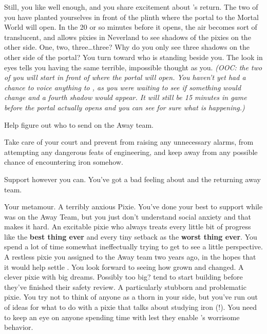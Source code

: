 \documentclass[char]{PP}
\begin{document}
Still, you like \cFButterfly{} well enough, and you share \cFButterfly{\their} excitement about \cFLost{}’s return. The two of you have planted yourselves in front of the plinth where the portal to the Mortal World will open. In the 20 or so minutes before it opens, the air becomes sort of translucent, and allows pixies in Neverland to see shadows of the pixies on the other side. One, two, three\ldots three? Why do you only see three shadows on the other side of the portal?  You turn toward \cFButterfly{} who is standing beside you. The look in \cFButterfly{\their} eyes tells you \cFButterfly{\they} \cFButterfly{\are} having the same terrible, impossible thought as you. \textit{(OOC: the two of you will start in front of where the portal will open. You haven’t yet had a chance to voice anything to \cFButterfly{}, as you were waiting to see if something would change and a fourth shadow would appear. It will still be 15 minutes in game before the portal actually opens and you can see for sure what is happening.)}

\begin{itemz}
	\item Help \cSHead{} figure out who to send on the Away team.
	\item Take care of your court and prevent \cMTree{} from raising any unnecessary alarms, \cMAirship{} from attempting any dangerous feats of engineering, and keep \cMIron{} away from any possible chance of encountering iron somehow.
	\item Support \cFButterfly{} however you can. You’ve got a bad feeling about \cFLost{} and the returning away team.
\end{itemz}

\begin{itemz}[Notes]
	\item 
\end{itemz}

\begin{contacts}
	\contact{\cFButterfly{}} Your metamour. A terribly anxious Pixie. You’ve done your best to support \cFButterfly{\them} while \cFLost{} was on the Away Team, but you just don’t understand \cFButterfly{\their} social anxiety and that makes it hard.
	\contact{\cMTree{}} An excitable pixie who always treats every little bit of progress like the \textbf{best thing ever} and every tiny setback as the \textbf{worst thing ever}. You spend a lot of time somewhat ineffectually trying to get \cMTree{\them} to see a little perspective.
	\contact{\cMChange{}} A restless pixie you assigned to the Away team two years ago, in the hopes that it would help settle \cMChange{\them}. You look forward to seeing how  \cMChange{\have} grown and changed.
	\contact{\cMAirship{}} A clever pixie with big dreams. Possibly too big? \cMAirship{\They} tend to start building before they’ve finished their safety review.
	\contact{\cMIron{}} A particularly stubborn and problematic pixie. You try not to think of anyone as a thorn in your side, but you’ve run out of ideas for what to do with a pixie that talks about studying iron (!). You need to keep an eye on anyone spending time with \cMIron{} lest they enable \cMIron{}’s worrisome behavior.
\end{contacts}
\end{document}
